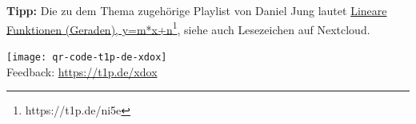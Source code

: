 \documentclass[a4paper,ngerman,12pt]{exam}
\begin{document}

\par \textbf{Tipp:} Die zu dem Thema zugehörige Playlist von Daniel Jung lautet \href{https://t1p.de/ni5e}{Lineare Funktionen (Geraden), y=m*x+n\footnote{\url{https://t1p.de/ni5e}}}, siehe auch Lesezeichen auf Nextcloud.

\texttt{[image: qr-code-t1p-de-xdox]}\\
Feedback: \href{https://t1p.de/xdox}{https://t1p.de/xdox}

%
\end{document}
